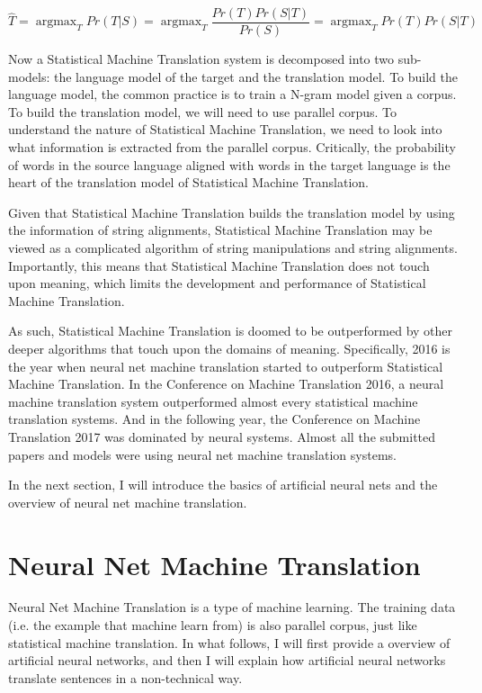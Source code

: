 \documentclass[final]{ua-thesis}
\numberwithin{equation}{section}
\DeclareMathOperator*{\argmax}{argmax}
\begin{document}
\begin{equation}
\hat{T}= \argmax_{T} Pr(T|S) = \argmax_{T} \frac{Pr(T)Pr(S|T)}{Pr(S)} = \argmax_{T} Pr(T)Pr(S|T)
\end{equation}

Now a Statistical Machine Translation system is decomposed into two sub-models: the language model of the target and the translation model. 
To build the language model, the common practice is to train a N-gram model given a corpus. 
To build the translation model, we will need to use parallel corpus. 
To understand the nature of Statistical Machine Translation, we need to look into what information is extracted from the parallel corpus. Critically, the probability of words in the source language aligned with words in the target language is the heart of the translation model of Statistical Machine Translation. 

Given that Statistical Machine Translation builds the translation model by using the information of string alignments, Statistical Machine Translation may be viewed as a complicated algorithm of string manipulations and string alignments. 
Importantly, this means that Statistical Machine Translation does not touch upon meaning, which limits the development and performance of Statistical Machine Translation. 

As such, Statistical Machine Translation is doomed to be outperformed by other deeper algorithms that touch upon the domains of meaning. Specifically, 2016 is the year when neural net machine translation started to outperform Statistical Machine Translation. In the Conference on Machine Translation 2016, a neural machine translation system outperformed almost every statistical machine translation systems. And in the following year, the Conference on Machine Translation 2017 was dominated by neural systems. Almost all the submitted papers and models were using neural net machine translation systems. 

In the next section, I will introduce the basics of artificial neural nets and the overview of neural net machine translation.  

\section{Neural Net Machine Translation}\label{neural_MT}

Neural Net Machine Translation is a type of machine learning. The training data (i.e. the example that machine learn from) is also parallel corpus, just like statistical machine translation. 
In what follows, I will first provide a overview of artificial neural networks, and then I will explain how artificial neural networks translate sentences in a non-technical way.
\end{document}
